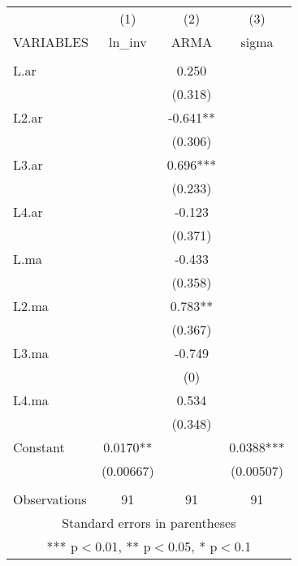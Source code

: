 \begin{tabular}{lccc} \hline
 & (1) & (2) & (3) \\
VARIABLES & ln\_inv & ARMA & sigma \\ \hline
 &  &  &  \\
L.ar &  & 0.250 &  \\
 &  & (0.318) &  \\
L2.ar &  & -0.641** &  \\
 &  & (0.306) &  \\
L3.ar &  & 0.696*** &  \\
 &  & (0.233) &  \\
L4.ar &  & -0.123 &  \\
 &  & (0.371) &  \\
L.ma &  & -0.433 &  \\
 &  & (0.358) &  \\
L2.ma &  & 0.783** &  \\
 &  & (0.367) &  \\
L3.ma &  & -0.749 &  \\
 &  & (0) &  \\
L4.ma &  & 0.534 &  \\
 &  & (0.348) &  \\
Constant & 0.0170** &  & 0.0388*** \\
 & (0.00667) &  & (0.00507) \\
 &  &  &  \\
 Observations & 91 & 91 & 91 \\ \hline
\multicolumn{4}{c}{ Standard errors in parentheses} \\
\multicolumn{4}{c}{ *** p$<$0.01, ** p$<$0.05, * p$<$0.1} \\
\end{tabular}
